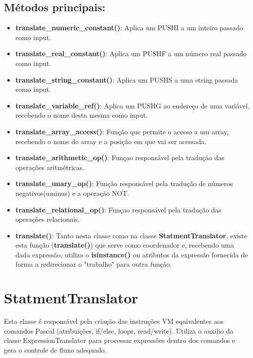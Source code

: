 \subsection*{Métodos principais:}
\begin{itemize}

    \item \textbf{translate\_numeric\_constant()}: Aplica um PUSHI a um inteiro passado como input.
    \item \textbf{translate\_real\_constant()}:  Aplica um PUSHF a um número real passado como input.
    \item \textbf{translate\_string\_constant()}:  Aplica um PUSHS a uma string passada como input.
    \item \textbf{translate\_variable\_ref()}:  Aplica um PUSHG ao endereço de uma variável, recebendo o nome desta mesma como input.
    \item \textbf{translate\_array\_access()}: Função que permite o acesso a um array,  recebendo o nome do array e a posição em que vai ser acessada.
    \item \textbf{translate\_arithmetic\_op()}: Funçao responsável pela tradução das operações aritmétricas.
    \item \textbf{translate\_unary\_op()}: Função responsável pela tradução de números negativos(uminus) e a operação NOT.
    \item \textbf{translate\_relational\_op()}: Funçao responsável pela tradução das operações relacionais. 
    \item \textbf{translate()}: Tanto nesta classe como na classe \textbf{StatmentTranslator}, existe esta função (\textbf{translate()}) que serve como coordenador e, recebendo uma dada expressão, utiliza o \textbf{isinstance()} ou atributos da expressão fornecida de forma a redirecionar o "trabalho" para outra função.
    
\end{itemize}

\newpage
\section{StatmentTranslator}
Esta classe é responsável pela criação das instruções VM equivalentes aos comandos Pascal (atribuições, if/else, loops, read/write). Utiliza o auxilio da classe ExpressionTranslator para processar expressões dentro dos comandos e gera o controle de fluxo adequado.


